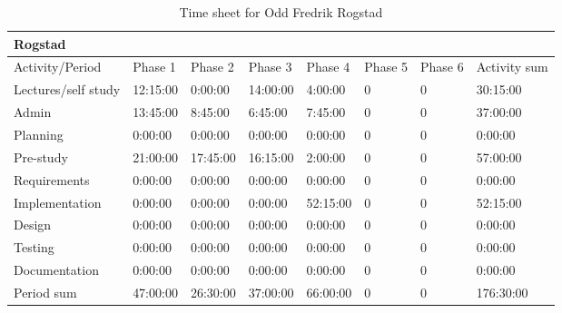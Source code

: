 \documentclass[11pt]{book}
\begin{document}
\begin{table}[H]
\centering
\begin{tabular}{| l | l | l | l | l | l | l | l |}
    \hline
    Rogstad             &             &             &             &             &             &             &                 \\ \hline                        
    Activity/Period     & Phase 1     & Phase 2     & Phase  3    & Phase 4     & Phase 5     & Phase 6     & Activity sum    \\ \hline
    Lectures/self study & 12:15:00    & 0:00:00     & 14:00:00    & 4:00:00     & 0           & 0           & 30:15:00        \\ \hline
    Admin               & 13:45:00    & 8:45:00     & 6:45:00     & 7:45:00     & 0           & 0           & 37:00:00        \\ \hline
    Planning            & 0:00:00     & 0:00:00     & 0:00:00     & 0:00:00     & 0           & 0           & 0:00:00         \\ \hline
    Pre-study           & 21:00:00    & 17:45:00    & 16:15:00    & 2:00:00     & 0           & 0           & 57:00:00        \\ \hline
    Requirements        & 0:00:00     & 0:00:00     & 0:00:00     & 0:00:00     & 0           & 0           & 0:00:00         \\ \hline
    Implementation      & 0:00:00     & 0:00:00     & 0:00:00     & 52:15:00    & 0           & 0           & 52:15:00        \\ \hline
    Design              & 0:00:00     & 0:00:00     & 0:00:00     & 0:00:00     & 0           & 0           & 0:00:00         \\ \hline
    Testing             & 0:00:00     & 0:00:00     & 0:00:00     & 0:00:00     & 0           & 0           & 0:00:00         \\ \hline
    Documentation       & 0:00:00     & 0:00:00     & 0:00:00     & 0:00:00     & 0           & 0           & 0:00:00         \\ \hline
    Period sum          & 47:00:00    & 26:30:00    & 37:00:00    & 66:00:00    & 0           & 0           & 176:30:00       \\ \hline
\end{tabular}
\caption{Time sheet for Odd Fredrik Rogstad}
\label{tab:appendix_timesheets_odd}
\end{table}
\end{document}
